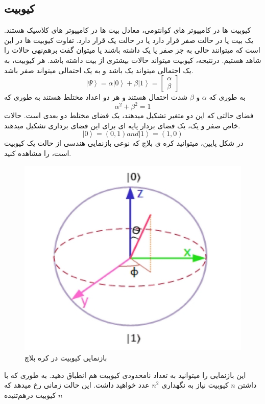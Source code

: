 \subsection{کیوبیت}
کیوبیت ها
 در کامپیوتر های کوانتومی، معادل بیت ها
 در کامپیوتر های کلاسیک هستند. یک بیت یا در حالت صفر قرار دارد یا در حالت یک قرار دارد. تفاوت کیوبیت ها در این است که میتوانند حالی به جز صفر یا یک داشته باشند یا میتوان گفت برهم‌نهی 
حالات را شاهد هستیم. درنتیجه، کیوبیت میتواند حالات بیشتری از بیت داشته باشد. هر کیوبیت، به یک احتمالی میتواند یک باشد و به یک احتمالی میتواند صفر باشد. 
\begin{equation}
\left|\Psi\right\rangle = \alpha\left|0\right\rangle + \beta\left|1\right\rangle = \begin{bmatrix}
 \alpha
\\
\beta
\end{bmatrix}
\end{equation}
به طوری که 
$\alpha$
 و 
$\beta$
  شدت احتمال هستند و هر دو اعداد مختلط هستند به طوری که
\begin{equation}
\alpha^{2} + \beta^{2} = 1
\end{equation}
فضای حالتی که این دو متغیر تشکیل میدهند، یک فضای مختلط دو بعدی است.  حالات خاص صفر و یک، یک فضای بردار پایه ای
برای این فضای برداری تشکیل میدهند.
\begin{equation}
\left|0\right\rangle = (0, 1) and \left|1\right\rangle = (1, 0)
\end{equation}
در شکل پایین، میتوانید کره ی بلاچ
  که نوعی بازنمایی هندسی از حالت یک کیوبیت است، را مشاهده کنید.
\begin{figure}[!h]
\centerline{\includegraphics[width=.5\textwidth]{bloch.jpeg}}
\caption{بازنمایی کیوبیت در کره بلاچ}
\end{figure}
این بازنمایی را میتوانید به تعداد نامحدودی کیوبیت هم انطباق دهید. به طوری که با داشتن $n$ کیوبیت نیاز به نگهداری $n^{2}$ عدد خواهید داشت. این حالت زمانی رخ میدهد که $n$ کیوبیت درهم‌تنیده
